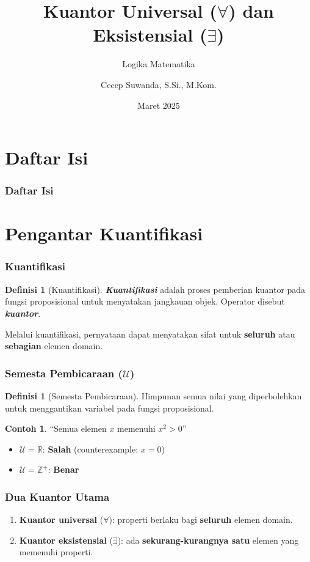\documentclass[handout]{beamer}
\subtitle[Logika Matematika]{Logika Matematika}
\title[Kuantor]{\texorpdfstring{Kuantor Universal ($\forall$) dan Eksistensial ($\exists$)}{Kuantor Universal dan Eksistensial}}
\author{Cecep Suwanda, S.Si., M.Kom.}
\date{Maret 2025}
\institute{Universitas Bale Bandung}
\newcommand{\logic}[1]{\textbf{\textit{#1}}}
\theoremstyle{definition}
\newtheorem{definisi}[theorem]{Definisi}
\theoremstyle{example}
\newtheorem{contoh}[theorem]{Contoh}
\begin{document}
\maketitle

\section*{Daftar Isi}
\begin{frame}
\frametitle{Daftar Isi}
\tableofcontents
\end{frame}

\section{Pengantar Kuantifikasi}

\begin{frame}
\frametitle{Kuantifikasi}
\begin{definisi}[Kuantifikasi]
\logic{Kuantifikasi} adalah proses pemberian kuantor pada fungsi proposisional untuk menyatakan jangkauan objek. Operator disebut \logic{kuantor}.
\end{definisi}
Melalui kuantifikasi, pernyataan dapat menyatakan sifat untuk \textbf{seluruh} atau \textbf{sebagian} elemen domain.
\end{frame}

\begin{frame}
\frametitle{Semesta Pembicaraan ($\mathcal{U}$)}
\begin{definisi}[Semesta Pembicaraan]
Himpunan semua nilai yang diperbolehkan untuk menggantikan variabel pada fungsi proposisional.
\end{definisi}
\begin{contoh}
``Semua elemen $x$ memenuhi $x^2 > 0$''
\begin{itemize}
  \item $\mathcal{U} = \mathbb{R}$: \textbf{Salah} (counterexample: $x=0$)
  \item $\mathcal{U} = \mathbb{Z}^+$: \textbf{Benar}
\end{itemize}
\end{contoh}
\end{frame}

\begin{frame}
\frametitle{Dua Kuantor Utama}
\begin{enumerate}
  \item \textbf{Kuantor universal} ($\forall$): properti berlaku bagi \textbf{seluruh} elemen domain.
  \item \textbf{Kuantor eksistensial} ($\exists$): ada \textbf{sekurang-kurangnya satu} elemen yang memenuhi properti.
\end{enumerate}
\end{frame}
\end{document}
